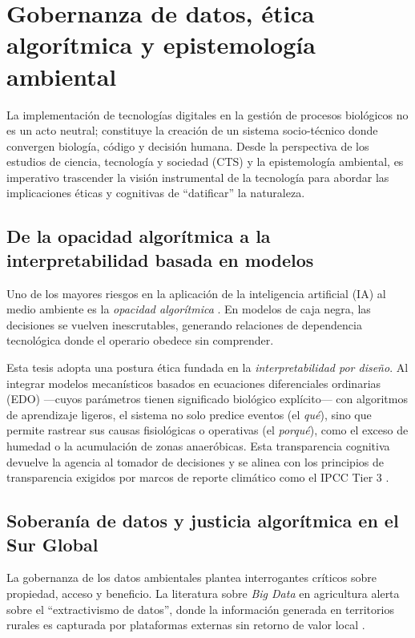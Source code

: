 \section{Gobernanza de datos, ética algorítmica y epistemología ambiental}

La implementación de tecnologías digitales en la gestión de procesos biológicos no es un acto neutral; constituye la creación de un sistema socio-técnico donde convergen biología, código y decisión humana. Desde la perspectiva de los estudios de ciencia, tecnología y sociedad (CTS) y la epistemología ambiental, es imperativo trascender la visión instrumental de la tecnología para abordar las implicaciones éticas y cognitivas de ``datificar'' la naturaleza.

\subsection{De la opacidad algorítmica a la interpretabilidad basada en modelos}
Uno de los mayores riesgos en la aplicación de la inteligencia artificial (IA) al medio ambiente es la \textit{opacidad algorítmica} \parencite{burrellHowMachineThinks2016}. En modelos de caja negra, las decisiones se vuelven inescrutables, generando relaciones de dependencia tecnológica donde el operario obedece sin comprender.

Esta tesis adopta una postura ética fundada en la \textit{interpretabilidad por diseño}. Al integrar modelos mecanísticos basados en ecuaciones diferenciales ordinarias (EDO) —cuyos parámetros tienen significado biológico explícito— con algoritmos de aprendizaje ligeros, el sistema no solo predice eventos (el \textit{qué}), sino que permite rastrear sus causas fisiológicas o operativas (el \textit{porqué}), como el exceso de humedad o la acumulación de zonas anaeróbicas. Esta transparencia cognitiva devuelve la agencia al tomador de decisiones y se alinea con los principios de transparencia exigidos por marcos de reporte climático como el IPCC Tier 3 \parencite{adadiPeekingBlackBoxSurvey2018}.

\subsection{Soberanía de datos y justicia algorítmica en el Sur Global}
La gobernanza de los datos ambientales plantea interrogantes críticos sobre propiedad, acceso y beneficio. La literatura sobre \textit{Big Data} en agricultura alerta sobre el ``extractivismo de datos'', donde la información generada en territorios rurales es capturada por plataformas externas sin retorno de valor local \parencite{carolanAutomatedAgrifoodFutures2020}.

